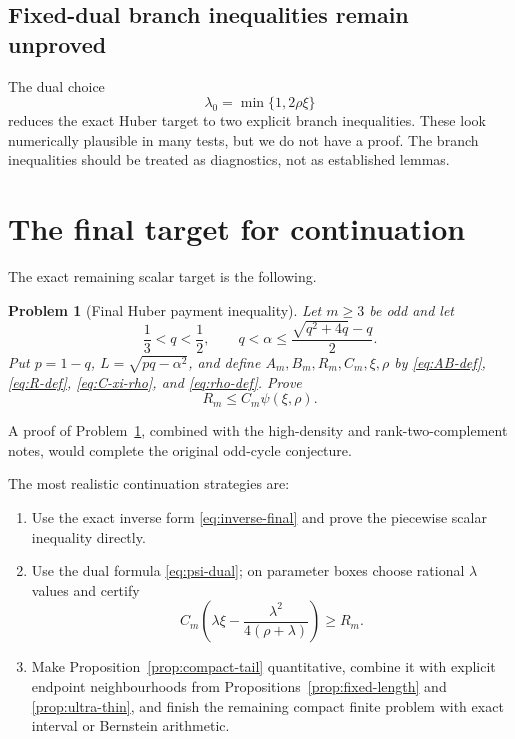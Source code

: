 \documentclass[11pt]{article}
\newtheorem{problem}[theorem]{Problem}
\begin{document}
\subsection{Fixed-dual branch inequalities remain unproved}

The dual choice
\[
        \lambda_0=\min\{1,2\rho\xi\}
\]
reduces the exact Huber target to two explicit branch inequalities.  These
look numerically plausible in many tests, but we do not have a proof.  The
branch inequalities should be treated as diagnostics, not as established
lemmas.

\section{The final target for continuation}

The exact remaining scalar target is the following.

\begin{problem}[Final Huber payment inequality]\label{prob:final-huber}
Let $m\ge3$ be odd and let
\[
        \frac13<q<\frac12,
        \qquad
        q<\alpha\le\frac{\sqrt{q^2+4q}-q}{2}.
\]
Put $p=1-q$, $L=\sqrt{pq-\alpha^2}$, and define $A_m,B_m,R_m,C_m,\xi,\rho$
by \eqref{eq:AB-def}, \eqref{eq:R-def}, \eqref{eq:C-xi-rho}, and
\eqref{eq:rho-def}.  Prove
\[
        R_m\le C_m\psi(\xi,\rho).
\]
\end{problem}

A proof of Problem~\ref{prob:final-huber}, combined with the high-density
and rank-two-complement notes, would complete the original odd-cycle
conjecture.

The most realistic continuation strategies are:
\begin{enumerate}[label=(\alph*)]
\item Use the exact inverse form \eqref{eq:inverse-final} and prove the
piecewise scalar inequality directly.
\item Use the dual formula \eqref{eq:psi-dual}; on parameter boxes choose
rational $\lambda$ values and certify
\[
        C_m\left(\lambda\xi-\frac{\lambda^2}{4(\rho+\lambda)}\right)
        \ge R_m.
\]
\item Make Proposition~\ref{prop:compact-tail} quantitative, combine it
with explicit endpoint neighbourhoods from Propositions~\ref{prop:fixed-length}
and \ref{prop:ultra-thin}, and finish the remaining compact finite problem
with exact interval or Bernstein arithmetic.
\end{enumerate}

\appendix
\end{document}
